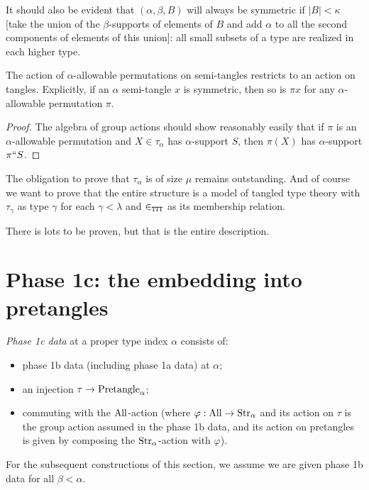 \begin{lemma}
\label {lem:small-subsets-closure}
It should also be evident that $(\alpha,\beta,B)$ will always be symmetric if $|B|<\kappa$ [take the union of the $\beta$-supports of elements of $B$ and add $\alpha$ to all the second components of elements of this union]:  all small subsets of a type are realized in each higher type.
\end{lemma}

\begin{lemma}
  \label{lem:tangle-action}
  The action of $\alpha$-allowable permutations on semi-tangles restricts to an action on tangles.  Explicitly, if an $\alpha$ semi-tangle $x$ is symmetric, then so is $\pi x$ for any $\alpha$-allowable permutation $\pi$.
\end{lemma}
\begin{proof}
  The algebra of group actions should show reasonably easily that if $\pi$ is an $\alpha$-allowable permutation and $X \in \tau_\alpha$ has $\alpha$-support $S$, then $\pi(X)$ has $\alpha$-support $\pi``S$.
\end{proof}

The obligation to prove that $\tau_\alpha$ is of size $\mu$ remains outstanding.  And of course we want to prove that the entire structure is a model of tangled type theory with $\tau_\gamma$ as type $\gamma$ for each $\gamma<\lambda$ and $\in_{\tt TTT}$ as its membership relation.

There is lots to be proven, but that is the entire description.

\section{Phase 1c: the embedding into pretangles}

\begin{definition}
  \label{def:phase-1c-data}
  \emph{Phase 1c data} at a proper type index $\alpha$ consists of:
  \begin{itemize}
  \item phase 1b data (including phase 1a data) at $\alpha$;
  \item an injection $\tau \to \mathrm{Pretangle}_\alpha$;
  \item commuting with the $\mathrm{All}$-action (where $\varphi : \mathrm{All} \to \mathrm{Str}_\alpha$ and its action on $\tau$ is the group action assumed in the phase 1b data, and its action on pretangles is given by composing the $\mathrm{Str}_\alpha$-action with $\varphi$).
  \end{itemize}

  For the subsequent constructions of this section, we assume we are given phase 1b data for all $\beta < \alpha$.
\end{definition}


